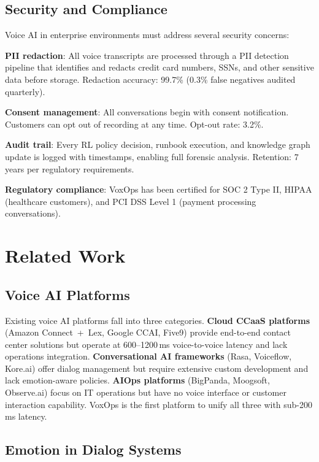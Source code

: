 \documentclass[conference,10pt]{IEEEtran}
\begin{document}
\subsection{Security and Compliance}

Voice AI in enterprise environments must address several security concerns:

\textbf{PII redaction}: All voice transcripts are processed through a PII detection pipeline that identifies and redacts credit card numbers, SSNs, and other sensitive data before storage. Redaction accuracy: 99.7\% (0.3\% false negatives audited quarterly).

\textbf{Consent management}: All conversations begin with consent notification. Customers can opt out of recording at any time. Opt-out rate: 3.2\%.

\textbf{Audit trail}: Every RL policy decision, runbook execution, and knowledge graph update is logged with timestamps, enabling full forensic analysis. Retention: 7 years per regulatory requirements.

\textbf{Regulatory compliance}: VoxOps has been certified for SOC 2 Type II, HIPAA (healthcare customers), and PCI DSS Level 1 (payment processing conversations).

\section{Related Work}
\label{sec:related}

\subsection{Voice AI Platforms}

Existing voice AI platforms fall into three categories. \textbf{Cloud CCaaS platforms} (Amazon Connect~+~Lex, Google CCAI, Five9) provide end-to-end contact center solutions but operate at 600--1200\,ms voice-to-voice latency and lack operations integration. \textbf{Conversational AI frameworks} (Rasa, Voiceflow, Kore.ai) offer dialog management but require extensive custom development and lack emotion-aware policies. \textbf{AIOps platforms} (BigPanda, Moogsoft, Observe.ai) focus on IT operations but have no voice interface or customer interaction capability. VoxOps is the first platform to unify all three with sub-200\,ms latency.

\subsection{Emotion in Dialog Systems}
\end{document}
